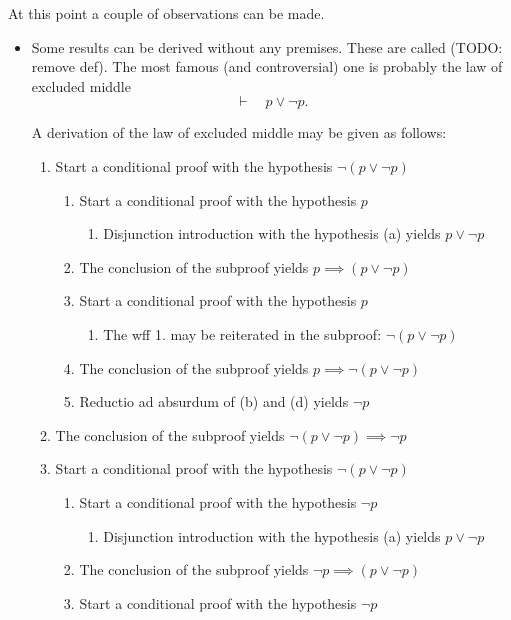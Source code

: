 At this point a couple of observations can be made.
\begin{itemize}
\item Some results can be derived without any premises. These are called  (TODO: remove def). The most famous (and controversial) one is probably the law of excluded middle
\[ \vdash \quad p \lor \neg p. \]
\begin{example}
A derivation of the law of excluded middle may be given as follows:
\begin{enumerate}
\item Start a conditional proof with the hypothesis $\neg(p\lor \neg p)$
\begin{enumerate}
\item Start a conditional proof with the hypothesis $p$
\begin{enumerate}
\item Disjunction introduction with the hypothesis (a) yields $p \lor \neg p$
\end{enumerate}
\item The conclusion of the subproof yields $p \implies (p \lor \neg p)$
\item Start a conditional proof with the hypothesis $p$
\begin{enumerate}
\item The wff 1. may be reiterated in the subproof: $\neg(p\lor \neg p)$
\end{enumerate}
\item The conclusion of the subproof yields $p \implies \neg(p \lor \neg p)$
\item Reductio ad absurdum of (b) and (d) yields $\neg p$
\end{enumerate}
\item The conclusion of the subproof yields $\neg(p\lor \neg p) \implies \neg p$
\item Start a conditional proof with the hypothesis $\neg(p\lor \neg p)$
\begin{enumerate}
\item Start a conditional proof with the hypothesis $\neg p$
\begin{enumerate}
\item Disjunction introduction with the hypothesis (a) yields $p \lor \neg p$
\end{enumerate}
\item The conclusion of the subproof yields $\neg p \implies (p \lor \neg p)$
\item Start a conditional proof with the hypothesis $\neg p$

\end{enumerate}
\end{enumerate}
\end{example}
\end{itemize}
